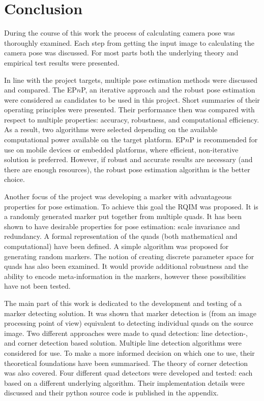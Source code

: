 \chapter{Conclusion}\label{sect:conclusion}

During the course of this work the process of calculating camera pose was thoroughly examined.
Each step from getting the input image to calculating the camera pose was discussed.
For most parts both the underlying theory and empirical test results were presented.

In line with the project targets, multiple pose estimation methods were discussed and compared.
The EP$n$P\cite{Lepetit2008}, an iterative approach\cite{iterative} and the robust pose estimation\cite{robust} were considered as candidates to be used in this project.
Short summaries of their operating principles were presented.
Their performance then was compared with respect to multiple properties: accuracy, robustness, and computational efficiency.
As a result, two algorithms were selected depending on the available computational power available on the target platform.
EP$n$P is recommended for use on mobile devices or embedded platforms, where efficient, non-iterative solution is preferred.
However, if robust and accurate results are necessary (and there are enough resources), the robust pose estimation algorithm is the better choice.

Another focus of the project was developing a marker with advantageous properties for pose estimation.
To achieve this goal the RQIM was proposed.
It is a randomly generated marker put together from multiple quads.
It has been shown to have desirable properties for pose estimation: scale invariance and redundancy.
A formal representation of the quads (both mathematical and computational) have been defined.
A simple algorithm was proposed for generating random markers.
The notion of creating discrete parameter space for quads has also been examined.
It would provide additional robustness and the ability to encode meta-information in the markers, however these possibilities have not been tested.

The main part of this work is dedicated to the development and testing of a marker detecting solution.
It was shown that marker detection is (from an image processing point of view) equivalent to detecting individual quads on the source image.
Two different approaches were made to quad detection: line detection-, and corner detection based solution.
Multiple line detection algorithms were considered for use.
To make a more informed decision on which one to use, their theoretical foundations have been summarised.
The theory of corner detection was also covered.
Four different quad detectors were developed and tested: each based on a different underlying algorithm.
Their implementation details were discussed and their python source code is published in the appendix.

